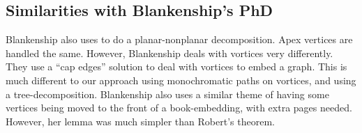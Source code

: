 \subsection{Similarities with Blankenship's PhD}
Blankenship also uses \textcite{heathPagenumberGenusGraphs1992} to do a planar-nonplanar decomposition. Apex vertices are handled the same. However, Blankenship deals with vortices very differently. They use a ``cap edges'' solution to deal with vortices to embed a graph. This is much different to our approach using monochromatic paths on vortices, and using a tree-decomposition. 
Blankenship also uses a similar theme of having some vertices being moved to the front of a book-embedding, with extra pages needed. However, her lemma was much simpler than Robert's theorem. 